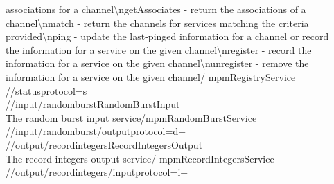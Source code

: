 associations for a channel\textbackslash{}ngetAssociates - return the associations of a\\
channel\textbackslash{}nmatch - return the channels for services matching the criteria\\
provided\textbackslash{}nping - update the last-pinged information for a channel or
record\\
the information for a service on the given channel\textbackslash{}nregister - record the\\
information for a service on the given channel\textbackslash{}nunregister - remove the\\
information for a service on the given channel\pseudotab\textellipsis/%
mpmRegistryService\pseudotwotabs\\
/\dollarService/status\textbraceleft{}protocol=s\textbraceright\\

/\serviceName/input/randomburst\pseudotab{}RandomBurst\pseudotab{}Input\pseudotab\\
The random burst input service\pseudotwotabs\textellipsis/mpmRandomBurstService%
\pseudotwotabs\\
/\serviceName/input/randomburst/output\textbraceleft{}protocol=d+\textbraceright\\

/\serviceName/output/recordintegers\pseudotab{}RecordIntegers\pseudotab{}Output%
\pseudotab\\
The record integers output service\pseudotwotabs\textellipsis/%
mpmRecordIntegersService\pseudotab\\
/\serviceName/output/recordintegers/input\textbraceleft{}protocol=i+\textbraceright\\

